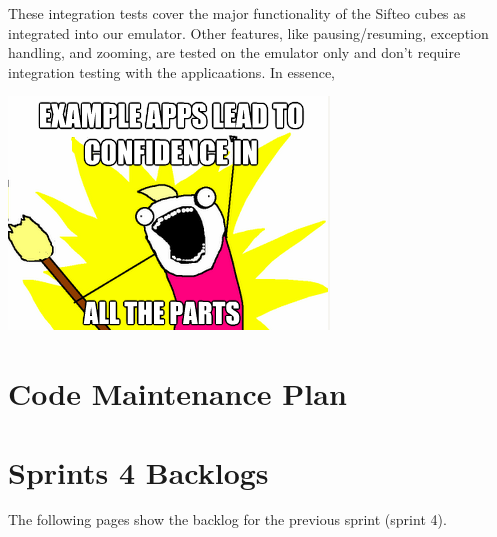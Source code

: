 \documentclass[12pt]{article}
\begin{document}
These integration tests cover the major functionality of the Sifteo cubes as integrated into our emulator. Other features, like pausing/resuming, exception handling, and zooming, are tested on the emulator only and don't require integration testing with the applicaations. In essence, \\

\begin{center}
	\includegraphics{exampleApps.png}
\end{center}

\section*{Code Maintenance Plan}

\section*{Sprints 4 Backlogs}
The following pages show the backlog for the previous sprint (sprint 4). \\


        
\end{document}
